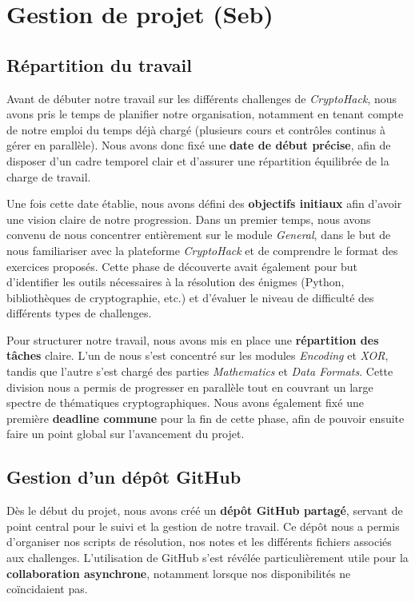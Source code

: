 \section{Gestion de projet (Seb)}
\subsection{Répartition du travail}
Avant de débuter notre travail sur les différents challenges de
\textit{CryptoHack}, nous avons pris le temps de planifier notre
organisation, notamment en tenant compte de notre emploi du temps déjà
chargé (plusieurs cours et contrôles continus à gérer en parallèle). Nous
avons donc fixé une \textbf{date de début précise}, afin de disposer d’un
cadre temporel clair et d’assurer une répartition équilibrée de la charge
de travail.

Une fois cette date établie, nous avons défini des \textbf{objectifs
initiaux} afin d’avoir une vision claire de notre progression. Dans un
premier temps, nous avons convenu de nous concentrer entièrement sur le
module \textit{General}, dans le but de nous familiariser avec la
plateforme \textit{CryptoHack} et de comprendre le format des exercices
proposés. Cette phase de découverte avait également pour but d’identifier
les outils nécessaires à la résolution des énigmes (Python, bibliothèques
de cryptographie, etc.) et d’évaluer le niveau de difficulté des différents
types de challenges.

Pour structurer notre travail, nous avons mis en place une
\textbf{répartition des tâches} claire. L’un de nous s’est concentré sur
les modules \textit{Encoding} et \textit{XOR}, tandis que l’autre s’est
chargé des parties \textit{Mathematics} et \textit{Data Formats}. Cette
division nous a permis de progresser en parallèle tout en couvrant un
large spectre de thématiques cryptographiques. Nous avons également fixé
une première \textbf{deadline commune} pour la fin de cette phase, afin de
pouvoir ensuite faire un point global sur l’avancement du projet.

\subsection{Gestion d'un dépôt GitHub}
Dès le début du projet, nous avons créé un \textbf{dépôt GitHub partagé},
servant de point central pour le suivi et la gestion de notre travail. Ce
dépôt nous a permis d’organiser nos scripts de résolution, nos notes et les
différents fichiers associés aux challenges. L’utilisation de GitHub s’est
révélée particulièrement utile pour la \textbf{collaboration asynchrone},
notamment lorsque nos disponibilités ne coïncidaient pas.

